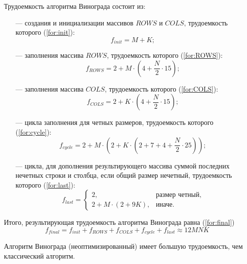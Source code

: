 Трудоемкость алгоритма Винограда состоит из:
\begin{itemize}
	\item[---] создания и инициализации массивов $ROWS$ и $COLS$, трудоемкость которого (\ref{for:init}):
	\begin{equation}
		\label{for:init}
		f_{init} = M + K;
	\end{equation}
	
	\item[---] заполнения массива $ROWS$, трудоемкость которого (\ref{for:ROWS}):
	\begin{equation}
		\label{for:ROWS}
		f_{ROWS} = 2 + M \cdot (4 + \frac{N}{2} \cdot 15);
	\end{equation}
	
	\item[---] заполнения массива $COLS$, трудоемкость которого (\ref{for:COLS}):
	\begin{equation}
		\label{for:COLS}
		f_{COLS} = 2 + K \cdot (4 + \frac{N}{2} \cdot 15);
	\end{equation}
	
	\item[---] цикла заполнения для четных размеров, трудоемкость которого (\ref{for:cycle}):
	\begin{equation}
		\label{for:cycle}
		f_{cycle} = 2 + M \cdot (2 + K \cdot (2 + 7 + 4 + \frac{N}{2} \cdot 25));		
	\end{equation}
	
	\item[---] цикла, для дополнения результирующего массива суммой последних нечетных строки и столбца, если общий размер нечетный, трудоемкость которого (\ref{for:last}):
	\begin{equation}
		\label{for:last}
		f_{last} = \begin{cases}
			2, & \text{размер четный,}\\
			2 + M \cdot (2 + 9K), & \text{иначе.}
		\end{cases}
	\end{equation}
\end{itemize}

Итого, результирующая трудоемкость алгоритма Винограда равна (\ref{for:final})
\begin{equation}
	\label{for:final}
	f_{final} = f_{init} + f_{ROWS} + f_{COLS} + f_{cycle} + f_{last} \approx 12MNK
\end{equation}

Алгоритм Винограда (неоптимизированный) имеет большую трудоемкость, чем классический алгоритм.

